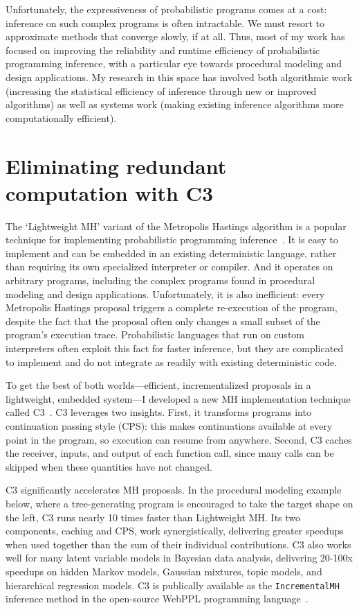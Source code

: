 \documentclass[
10pt, %
a4paper, %
oneside, %
headinclude,footinclude, %
BCOR5mm, %
]{scrartcl}
\begin{document}
Unfortunately, the expressiveness of probabilistic programs comes at a cost: inference on such complex programs is often intractable. We must resort to approximate methods that converge slowly, if at all. Thus, most of my work has focused on improving the reliability and runtime efficiency of probabilistic programming inference, with a particular eye towards procedural modeling and design applications. My research in this space has involved both algorithmic work (increasing the statistical efficiency of inference through new or improved algorithms) as well as systems work (making existing inference algorithms more computationally efficient).





\section*{Eliminating redundant computation with C3}

The `Lightweight MH' variant of the Metropolis Hastings algorithm is a popular technique for implementing probabilistic programming inference~\cite{Lightweight}. It is easy to implement and can be embedded in an existing deterministic language, rather than requiring its own specialized interpreter or compiler. And it operates on arbitrary programs, including the complex programs found in procedural modeling and design applications. Unfortunately, it is also inefficient: every Metropolis Hastings proposal triggers a complete re-execution of the program, despite the fact that the proposal often only changes a small subset of the program's execution trace. Probabilistic languages that run on custom interpreters often exploit this fact for faster inference, but they are complicated to implement and do not integrate as readily with existing deterministic code.

To get the best of both worlds---efficient, incrementalized proposals in a lightweight, embedded system---I developed a new MH implementation technique called C3~\cite{C3}. C3 leverages two insights. First, it transforms programs into continuation passing style (CPS): this makes continuations available at every point in the program, so execution can resume from anywhere. Second, C3 caches the receiver, inputs, and output of each function call, since many calls can be skipped when these quantities have not changed.

C3 significantly accelerates MH proposals. In the procedural modeling example below, where a tree-generating program is encouraged to take the target shape on the left, C3 runs nearly 10 times faster than Lightweight MH. Its two components, caching and CPS, work synergistically, delivering greater speedups when used together than the sum of their individual contributions. C3 also works well for many latent variable models in Bayesian data analysis, delivering 20-100x speedups on hidden Markov models, Gaussian mixtures, topic models, and hierarchical regression models. C3 is publically available as the \texttt{IncrementalMH} inference method in the open-source WebPPL programming language~\cite{WebPPL}.
\end{document}
